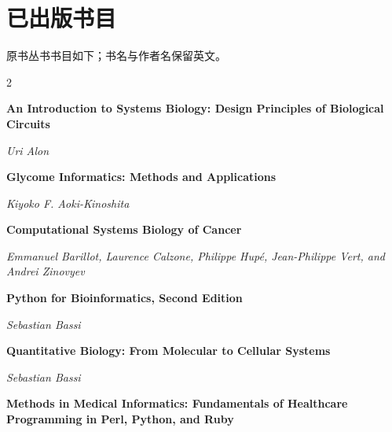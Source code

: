 
\section*{已出版书目}
\noindent 原书丛书书目如下；书名与作者名保留英文。
\begingroup
\small\linespread{1.06}\selectfont
\setlength{\parskip}{0pt}
\begin{multicols}{2}
\raggedright\raggedcolumns
\par\noindent\begin{minipage}{\linewidth}
\raggedright
\textbf{An Introduction to Systems Biology: Design Principles of Biological Circuits}\par
\textit{Uri Alon}
\end{minipage}\par\medskip
\par\noindent\begin{minipage}{\linewidth}
\raggedright
\textbf{Glycome Informatics: Methods and Applications}\par
\textit{Kiyoko F. Aoki-Kinoshita}
\end{minipage}\par\medskip
\par\noindent\begin{minipage}{\linewidth}
\raggedright
\textbf{Computational Systems Biology of Cancer}\par
\textit{Emmanuel Barillot, Laurence Calzone, Philippe Hupé, Jean-Philippe Vert, and Andrei Zinovyev}
\end{minipage}\par\medskip
\par\noindent\begin{minipage}{\linewidth}
\raggedright
\textbf{Python for Bioinformatics, Second Edition}\par
\textit{Sebastian Bassi}
\end{minipage}\par\medskip
\par\noindent\begin{minipage}{\linewidth}
\raggedright
\textbf{Quantitative Biology: From Molecular to Cellular Systems}\par
\textit{Sebastian Bassi}
\end{minipage}\par\medskip
\par\noindent\begin{minipage}{\linewidth}
\raggedright
\textbf{Methods in Medical Informatics: Fundamentals of Healthcare Programming in Perl, Python, and Ruby}\par

\end{minipage}
\end{multicols}
